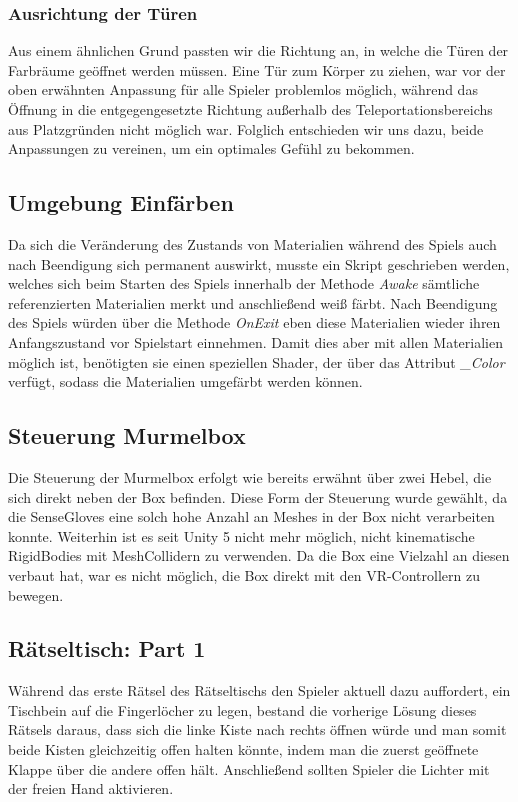 \subsubsection{Ausrichtung der Türen}
Aus einem ähnlichen Grund passten wir die Richtung an, in welche die Türen der Farbräume geöffnet werden müssen. Eine Tür zum Körper zu ziehen, war vor der oben erwähnten Anpassung für alle Spieler problemlos möglich, während das Öffnung in die entgegengesetzte Richtung außerhalb des Teleportationsbereichs aus Platzgründen nicht möglich war. Folglich entschieden wir uns dazu, beide Anpassungen zu vereinen, um ein optimales Gefühl zu bekommen.
\subsection{Umgebung Einfärben}
Da sich die Veränderung des Zustands von Materialien während des Spiels auch nach Beendigung sich permanent auswirkt, musste ein Skript geschrieben werden, welches sich beim Starten des Spiels innerhalb der Methode \textit{Awake} sämtliche referenzierten Materialien merkt und anschließend weiß färbt. Nach Beendigung des Spiels würden über die Methode \textit{OnExit} eben diese Materialien wieder ihren Anfangszustand vor Spielstart einnehmen. Damit dies aber mit allen Materialien möglich ist, benötigten sie einen speziellen Shader, der über das Attribut \textit{\_Color} verfügt, sodass die Materialien umgefärbt werden können.
\subsection{Steuerung Murmelbox}
Die Steuerung der Murmelbox erfolgt wie bereits erwähnt über zwei Hebel, die sich direkt neben der Box befinden. Diese Form der Steuerung wurde gewählt, da die SenseGloves eine solch hohe Anzahl an Meshes in der Box nicht verarbeiten konnte. Weiterhin ist es seit Unity 5 nicht mehr möglich, nicht kinematische RigidBodies mit MeshCollidern zu verwenden. Da die Box eine Vielzahl an diesen verbaut hat, war es nicht möglich, die Box direkt mit den VR-Controllern zu bewegen.
\subsection{Rätseltisch: Part 1}
Während das erste Rätsel des Rätseltischs den Spieler aktuell dazu auffordert, ein Tischbein auf die Fingerlöcher zu legen, bestand die vorherige Lösung dieses Rätsels daraus, dass sich die linke Kiste nach rechts öffnen würde und man somit beide Kisten gleichzeitig offen halten könnte, indem man die zuerst geöffnete Klappe über die andere offen hält. Anschließend sollten Spieler die Lichter mit der freien Hand aktivieren. 

